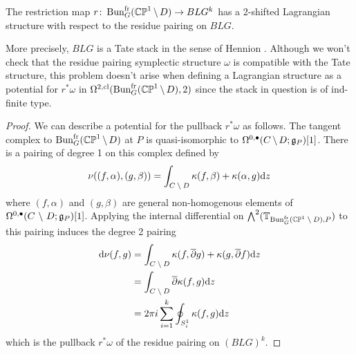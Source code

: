 \documentclass[10pt, oneside]{article}
\renewcommand{\d}{\mathrm{d}}
\newcommand{\fr}{\mathrm{fr}}
\begin{document}
\begin{lemma} \label{restriction_Lagn_lemma}
The restriction map $r \colon \bun_G^\fr(\bb{CP}^1 \! \bs \! D) \to BLG^k$ has a 2-shifted Lagrangian structure with respect to the residue pairing on $BLG$.
\end{lemma}

\begin{remark}
More precisely, $BLG$ is a Tate stack in the sense of Hennion \cite{Hennion}.  Although we won't check that the residue pairing symplectic structure $\omega$ is compatible with the Tate structure, this problem doesn't arise when defining a Lagrangian structure as a potential for $r^*\omega$ in $\Omega^{2,\mr{cl}}(\bun_G^\fr(\bb{CP}^1 \! \bs \! D), 2)$ since the stack in question is of ind-finite type.
\end{remark}

\begin{proof}
We can describe a potential for the pullback $r^*\omega$ as follows.  The tangent complex to $\bun_G^\fr(\bb{CP}^1 \! \bs \! D)$ at $P$ is quasi-isomorphic to $\Omega^{0,\bullet}(C \!\ \backslash \ \! D; \mathfrak{g}_P)[1]$.  There is a pairing of degree 1 on this complex defined by
\[ \nu((f,\alpha), (g,\beta)) = \int_{C \!\bs\! D} \kappa(f,\beta) + \kappa(\alpha,g) \d z\]
where $(f,\alpha)$ and $(g,\beta)$ are general non-homogenous elements of $\Omega^{0,\bullet}(C \ \backslash \  D; \mathfrak{g}_P)[1]$.  Applying the internal differential on $\bigwedge^2 (\bb T_{\bun_G^\fr(\bb{CP}^1 \! \bs \! D), P})$ to this pairing induces the degree 2 pairing
\begin{align*}
\d \nu(f,g) &= \int_{C \!\bs\! D} \kappa(f, \ol \dd g) + \kappa(g, \ol \dd f) \d z \\
&=\int_{C \!\bs\! D} \ol \dd \kappa(f, g) \d z \\
&=2 \pi i \sum_{i=1}^k \oint_{S^1_i} \kappa(f, g) \d z
\end{align*}
which is the pullback $r^*\omega$ of the residue pairing on $(BLG)^k$.
\end{proof}
\end{document}
